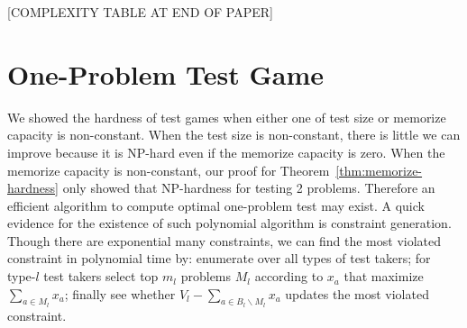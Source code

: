 \documentclass{article}
\newtheorem{theorem}{Theorem}
\begin{document}
%




[COMPLEXITY TABLE AT END OF PAPER]

\section{One-Problem Test Game}

We showed the hardness of test games when either one of test size or memorize
capacity is non-constant. When the test size is non-constant, there is little
we can improve because it is NP-hard even if the memorize capacity is zero.
When the memorize capacity is non-constant, our proof for
Theorem~\ref{thm:memorize-hardness} only showed that NP-hardness for testing 2
problems. Therefore an efficient algorithm to compute optimal one-problem test
may exist. A quick evidence for the existence of such polynomial algorithm is
constraint generation. Though there are exponential many constraints, we can
find the most violated constraint in polynomial time by: enumerate over all
types of test takers; for type-$l$ test takers  select top $m_l$ problems $M_l$
according to $x_a$ that maximize $\sum_{a \in M_l} x_a$; finally see whether
$V_l - \sum_{a \in B_l \backslash M_l} x_a$ updates the most violated
constraint.
\end{document}
